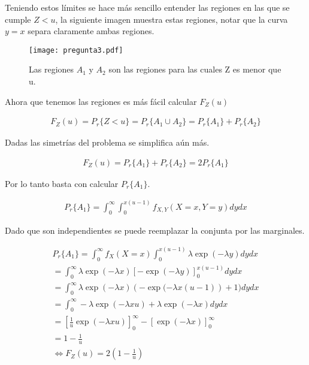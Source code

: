 		Teniendo estos límites se hace más sencillo entender las regiones en las que se cumple $Z < u$, la siguiente imagen muestra estas regiones, notar que la curva $y=x$ separa claramente ambas regiones. 

		\begin{figure}[H]
		    \centering
		    \texttt{[image: pregunta3.pdf]}
		    \caption{Las regiones $A_1$ y $A_2$ son las regiones para las cuales Z es menor que u.}
		    \label{fig:3_1}
		\end{figure}

		Ahora que tenemos las regiones es más fácil calcular $F_Z(u)$

		\begin{eqnarray}
			F_Z(u) = P_r\{Z < u\} = P_r\{A_1 \cup A_2\} = P_r\{A_1\} + P_r\{A_2\}
		\end{eqnarray}

		Dadas las simetrías del problema se simplifica aún más.

		\begin{eqnarray}
			F_Z(u) =  P_r\{A_1\} + P_r\{A_2\} = 2 P_r\{A_1\}
		\end{eqnarray}

		Por lo tanto basta con calcular $P_r\{A_1\}$.

		\begin{eqnarray}
			 P_r\{A_1\}=\int_{0}^{\infty} \int_{0}^{x(u-1)}  f_{X,Y}(X=x,Y=y)   dy dx
		\end{eqnarray}

		Dado que son independientes se puede reemplazar la conjunta por las marginales.

		\begin{eqnarray}
			 P_r\{A_1\}= \int_{0}^{\infty}f_{X}(X=x) \int_{0}^{x(u-1)}  \lambda \exp(-\lambda y)   dy dx \\
			=\int_{0}^{\infty} \lambda \exp(-\lambda x)   \left[-\exp(-\lambda y)\right]_{0}^{x(u-1)}   dy dx \\
			=\int_{0}^{\infty} \lambda \exp(-\lambda x)   \left(-\exp(-\lambda x(u-1)\right) + 1) dy dx\\
			=\int_{0}^{\infty} -\lambda \exp(-\lambda xu)   + \lambda\exp(-\lambda x) dy dx\\
			= \left[\frac{1}{u}\exp(-\lambda xu)\right]_{0}^{\infty} -\left[\exp(-\lambda x)\right]_{0}^{\infty} \\
			=1-\frac{1}{u}\\
			\iff F_Z(u) = 2\left(1-\frac{1}{u}\right)
		\end{eqnarray}

